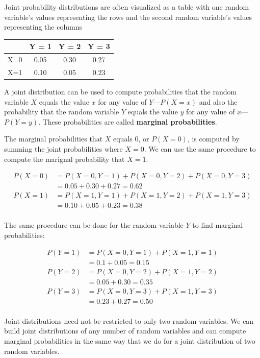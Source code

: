 Joint probability distributions are often visualized as a table with one random variable's values representing the rows and the second random variable's values representing the columns

\begin{table}[ht!]
    \centering
    \begin{tabular}{c|ccc}
             & Y = 1 & Y = 2 & Y = 3 \\
             \hline
    X=0    & 0.05  & 0.30  & 0.27  \\
    X=1    & 0.10  & 0.05  & 0.23 
    \end{tabular}
\end{table}

A joint distribution can be used to compute probabilities that the random variable $X$ equals the value $x$ for any value of $Y$---$P(X=x)$ and also the probability that the random variable $Y$ equals the value $y$ for any value of $x$---$P(Y=y)$.
These probabilities are called \textbf{marginal probabilities}.  

The marginal probabilities that $X$ equals $0$, or $P(X=0)$, is computed by summing the joint probabilities where $X=0$. We can use the same procedure to compute the marignal probability that $X=1$. 

\begin{align*}
    P(X=0) &= P(X=0,Y=1) + P(X=0,Y=2) + P(X=0,Y=3)\\
           &= 0.05+0.30+0.27 = 0.62\\
    P(X=1) &= P(X=1,Y=1) + P(X=1,Y=2) + P(X=1,Y=3) \\
           &= 0.10+0.05+0.23 = 0.38 \\
\end{align*}

The same procedure can be done for the random variable $Y$ to find marginal probabilities:

\begin{align*}
    P(Y=1) &= P(X=0,Y=1) + P(X=1,Y=1)\\
           &= 0.1+0.05 = 0.15 \\
    P(Y=2) &= P(X=0,Y=2) + P(X=1,Y=2)  \\
           &= 0.05+0.30 = 0.35 \\
    P(Y=3) &= P(X=0,Y=3) + P(X=1,Y=3)  \\
           &= 0.23+0.27 = 0.50\\
\end{align*}

Joint distributions need not be restricted to only two random variables. 
We can build joint distributions of any number of random variables and can compute marginal probabilities in the same way that we do for a joint distribution of two random variables.

